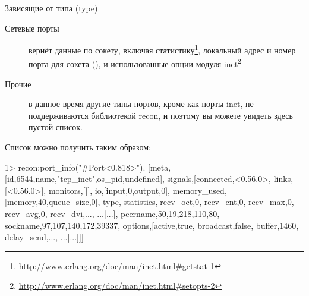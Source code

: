 \begin{description*}
\item[Зависящие от типа (type)] \hfill
\begin{description}		
	\item[Сетевые порты] вернёт данные по сокету, включая статистику\footnote{\href{http://www.erlang.org/doc/man/inet.html\#getstat-1}{http://www.erlang.org/doc/man/inet.html\#getstat-1}}, локальный адрес и номер порта для сокета (), и использованные опции модуля inet\footnote{\href{http://www.erlang.org/doc/man/inet.html\#setopts-2}{http://www.erlang.org/doc/man/inet.html\#setopts-2}}

	\item[Прочие] в данное время другие типы портов, кроме как порты inet, не поддерживаются библиотекой recon, и поэтому вы можете увидеть здесь пустой список.
\end{description}
\end{description*}
		
Список можно получить таким образом:

\begin{VerbatimEshell}
1> recon:port_info("#Port<0.818>").
[{meta,[{id,6544},{name,"tcp_inet"},{os_pid,undefined}]},
 {signals,[{connected,<0.56.0>},
           {links,[<0.56.0>]},
           {monitors,[]}]},
 {io,[{input,0},{output,0}]},
 {memory_used,[{memory,40},{queue_size,0}]},
 {type,[{statistics,[{recv_oct,0},
                     {recv_cnt,0},
                     {recv_max,0},
                     {recv_avg,0},
                     {recv_dvi,...},
                     {...}|...]},
        {peername,{{50,19,218,110},80}},
        {sockname,{{97,107,140,172},39337}},
        {options,[{active,true},
                  {broadcast,false},
                  {buffer,1460},
                  {delay_send,...},
                  {...}|...]}]}]
\end{VerbatimEshell}
		
